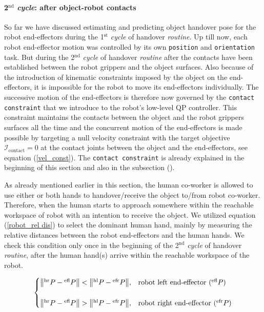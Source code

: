 \paragraph*{2$^\text{nd}$ \textit{cycle}: after object-robot contacts}

So far we have discussed estimating and predicting object handover pose for the robot end-effectors during the 1${}^\text{st}$ \textit{cycle} of handover \textit{routine}. Up till now, each robot end-effector motion was controlled by its own \texttt{position} and \texttt{orientation} task. But during the 2$^\text{nd}$ \textit{cycle} of handover \textit{routine} after the contacts have been established between the robot grippers and the object surfaces. Also because of the introduction of kinematic constraints imposed by the object on the end-effectors, it is impossible for the robot to move its end-effectors individually. The successive motion of the end-effectors is therefore now governed by the \texttt{contact constraint} that we introduce to the robot's low-level QP controller. This constraint maintains the contacts between the object and the robot grippers surfaces all the time and the concurrent motion of the end-effectors is made possible by targeting a null velocity constraint with the target objective $\mathscr{I}_\text{contact}=0$ at the contact joints between the object and the end-effectors, see equation (\ref{vel_const}). The \texttt{contact constraint} is already explained in the beginning of this section and also in the subsection ().

As already mentioned earlier in this section, the human co-worker is allowed to use either or both hands to handover/receive the object to/from robot co-worker. Therefore, when the human starts to approach somewhere within the reachable workspace of robot with an intention to receive the object. We utilized equation (\ref{robot_rel dis}) to select the dominant human hand, mainly by measuring the relative distances between the robot end-effectors and the human hands. We check this condition only once in the beginning of the 2$^\text{nd}$ \textit{cycle} of handover \textit{routine}, after the human hand(s) arrive within the reachable workspace of the robot.

\begin{equation}\label{robot_rel dis}
\centering
\begin{cases}
\norm{{}^\text{hr}{P} - {}^\text{efl}{P}} < \norm{{}^\text{hl}{P} - {}^\text{efr}{P}}, &  \text{robot left end-effector (${}^\text{efl}{P}$)} \\
\\
\norm{{}^\text{hr}{P} - {}^\text{efl}{P}} > \norm{{}^\text{hl}{P} - {}^\text{efr}{P}}, &  \text{robot right end-effector (${}^\text{efr}{P}$)} \\
\end{cases}
\end{equation}

